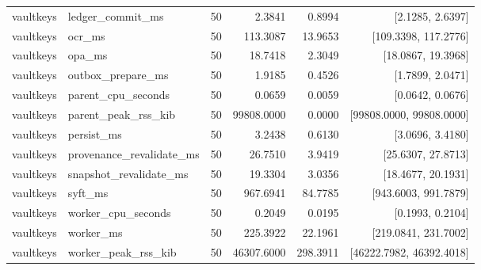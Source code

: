 \begin{tabular}{llrrrr}
vaultkeys & ledger\_commit\_ms & 50 & 2.3841 & 0.8994 & [2.1285, 2.6397] \\
vaultkeys & ocr\_ms & 50 & 113.3087 & 13.9653 & [109.3398, 117.2776] \\
vaultkeys & opa\_ms & 50 & 18.7418 & 2.3049 & [18.0867, 19.3968] \\
vaultkeys & outbox\_prepare\_ms & 50 & 1.9185 & 0.4526 & [1.7899, 2.0471] \\
vaultkeys & parent\_cpu\_seconds & 50 & 0.0659 & 0.0059 & [0.0642, 0.0676] \\
vaultkeys & parent\_peak\_rss\_kib & 50 & 99808.0000 & 0.0000 & [99808.0000, 99808.0000] \\
vaultkeys & persist\_ms & 50 & 3.2438 & 0.6130 & [3.0696, 3.4180] \\
vaultkeys & provenance\_revalidate\_ms & 50 & 26.7510 & 3.9419 & [25.6307, 27.8713] \\
vaultkeys & snapshot\_revalidate\_ms & 50 & 19.3304 & 3.0356 & [18.4677, 20.1931] \\
vaultkeys & syft\_ms & 50 & 967.6941 & 84.7785 & [943.6003, 991.7879] \\
vaultkeys & worker\_cpu\_seconds & 50 & 0.2049 & 0.0195 & [0.1993, 0.2104] \\
vaultkeys & worker\_ms & 50 & 225.3922 & 22.1961 & [219.0841, 231.7002] \\
vaultkeys & worker\_peak\_rss\_kib & 50 & 46307.6000 & 298.3911 & [46222.7982, 46392.4018] \\
\end{tabular}
